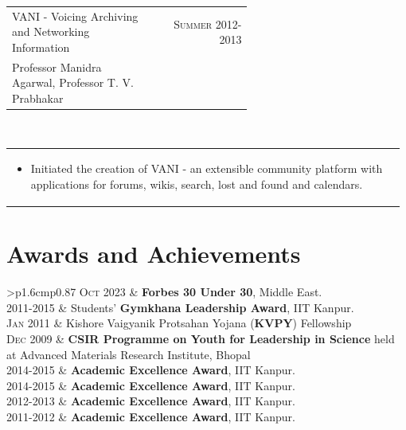 \documentclass[a4paper]{article} %
\newcommand{\verticalspacing}{-0.25cm}
\newcommand{\bulletspace}{0.7cm}
\newcommand{\projectheadspacing}{6.9cm}
\newcommand{\cproject}[5]{%
    \begin{tabular}{p{0.60\linewidth}r}
        \textcolor{NavyBlue}{\small #2} & \multicolumn{1}{m{ \projectheadspacing{} }}{\raggedleft \small {\textsc{#1}}}\\
        \small {#3} & \small {#4}
    \end{tabular}\\
    \begin{tabular}{p{0.98\linewidth}}
    \vspace{-0.3cm}
        \small{#5}
    \end{tabular}
    \vspace{\verticalspacing{}}
}
\newcommand{\itemlist}[1]{%
    \def\arraystretch{1.2}
    \begin{tabular}{>{\raggedleft}p{1.6cm}p{0.87\linewidth}}
        #1
    \end{tabular}
    \def\arraystretch{1.0}
}
\begin{document}
\cproject
    {Summer 2012-2013}
    {VANI - Voicing Archiving and Networking Information}
    {Professor Manidra Agarwal, Professor T. V. Prabhakar}
    {}
    {%
        \begin{itemize}[leftmargin=\bulletspace{}]
            \item Initiated the creation of VANI - an extensible community platform with applications
                for forums, wikis, search, lost and found and calendars.
        \end{itemize}
    }

\section{Awards and Achievements}

\itemlist {%
    \textsc{\small Oct 2023}    & \textbf{Forbes 30 Under 30}, Middle East. \\
    \textsc{\small 2011-2015}   & Students' \textbf{Gymkhana Leadership Award}, IIT Kanpur. \\
    \textsc{\small Jan 2011}    & Kishore Vaigyanik Protsahan Yojana (\textbf{KVPY}) Fellowship \\
    \textsc{\small Dec 2009}    & \textbf{CSIR Programme on Youth for Leadership in Science} held at
                                  Advanced Materials Research Institute, Bhopal\\

    \textsc{\small 2014-2015}   & \textbf{Academic Excellence Award}, IIT Kanpur. \\
    \textsc{\small 2014-2015}   & \textbf{Academic Excellence Award}, IIT Kanpur. \\
    \textsc{\small 2012-2013}   & \textbf{Academic Excellence Award}, IIT Kanpur. \\
    \textsc{\small 2011-2012}   & \textbf{Academic Excellence Award}, IIT Kanpur. \\
}
\end{document}
